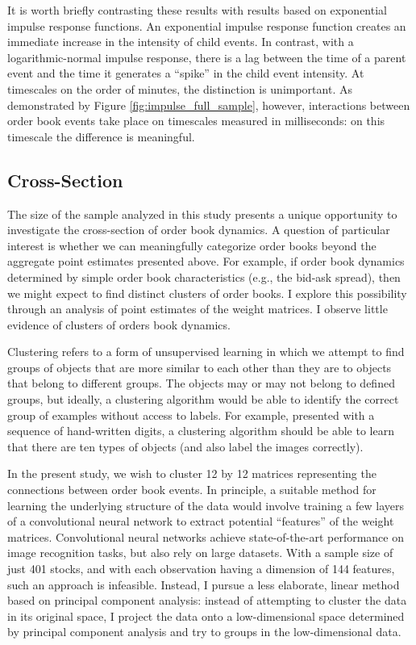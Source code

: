 It is worth briefly contrasting these results with results based on exponential impulse response functions. An exponential impulse response function creates an immediate increase in the intensity of child events. In contrast, with a logarithmic-normal impulse response, there is a lag between the time of a parent event and the time it generates a “spike” in the child event intensity. At timescales on the order of minutes, the distinction is unimportant. As demonstrated by Figure \ref{fig:impulse_full_sample}, however, interactions between order book events take place on timescales measured in milliseconds: on this timescale the difference is meaningful.

\subsection{Cross-Section}
The size of the sample analyzed in this study presents a unique opportunity to investigate the cross-section of order book dynamics. A question of particular interest is whether we can meaningfully categorize order books beyond the aggregate point estimates presented above. For example, if order book dynamics determined by simple order book characteristics (e.g., the bid-ask spread), then we might expect to find distinct clusters of order books. I explore this possibility through an analysis of point estimates of the weight matrices. I observe little evidence of clusters of orders book dynamics.

Clustering refers to a form of unsupervised learning in which we attempt to find groups of objects that are more similar to each other than they are to objects that belong to different groups. The objects may or may not belong to defined groups, but ideally, a clustering algorithm would be able to identify the correct group of examples without access to labels. For example, presented with a sequence of hand-written digits, a clustering algorithm should be able to learn that there are ten types of objects (and also label the images correctly).

In the present study, we wish to cluster 12 by 12 matrices representing the connections between order book events. In principle, a suitable method for learning the underlying structure of the data would involve training a few layers of a convolutional neural network to extract potential “features” of the weight matrices. Convolutional neural networks achieve state-of-the-art performance on image recognition tasks, but also rely on large datasets. With a sample size of just 401 stocks, and with each observation having a dimension of 144 features, such an approach is infeasible. Instead, I pursue a less elaborate, linear method based on principal component analysis: instead of attempting to cluster the data in its original space, I project the data onto a low-dimensional space determined by principal component analysis and try to groups in the low-dimensional data.

